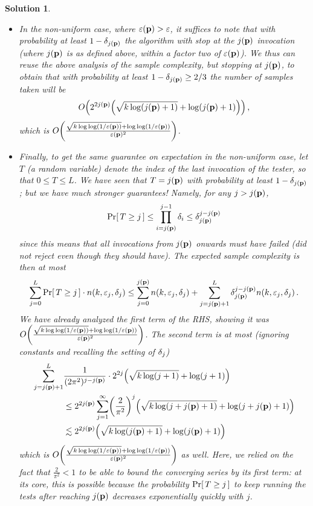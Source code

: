 \documentclass[biber,plain]{nowfnt} %
\newtheorem{solution}{Solution}[chapter]
\begin{document}
\begin{solution}
\begin{itemize}
\[
	\bigO{\frac{\sqrt{\ab\log\log(1/\dst)} + \log\log(1/\dst)}{\dst^2}}
\]
as claimed.
\item In the non-uniform case, where $\varepsilon(\mathbf{p}) > \varepsilon$, it suffices to note that with probability at least $1-\delta_{j(\mathbf{p})}$ the algorithm with stop at the $j(\mathbf{p})$ invocation (where $j(\mathbf{p})$ is as defined above, within a factor two of $\varepsilon(\mathbf{p})$). We thus can reuse the above analysis of the sample complexity, but stopping at $j(\mathbf{p})$, to obtain that with probability at least $1-\delta_{j(\mathbf{p})} \geq 2/3$ the number of samples taken will be
\[
	\bigO{2^{2j(\p)}\Paren{\sqrt{\ab\log(j(\p)+1)} + \log(j(\p)+1)}}\,,
\]
which is $\bigO{\frac{\sqrt{\ab\log\log(1/\dst(\p))} + \log\log(1/\dst(\p))}{\dst(\p)^2}}$.
\item Finally, to get the same guarantee \emph{on expectation} in the non-uniform case, let $T$ (a random variable) denote the index of the last invocation of the tester, so that $0\leq T \leq L$. We have seen that $T=j(\mathbf{p})$ with probability at least $1-\delta_{j(\mathbf{p})}$; but we have much stronger guarantees! Namely, for any $j > j(\mathbf{p})$,
\[
	\probaOf{T \geq j} \leq \prod_{i=j(\p)}^{j-1}\errprob_{i} \leq \errprob_{j(\p)}^{j-j(\p)}
\]
since this means that all invocations from $j(\mathbf{p})$ onwards must have failed (\ie did not reject even though they should have). The expected sample complexity is then at most
\[
	\sum_{j=0}^L \probaOf{T \geq j}\cdot  \ns(\ab,\dst_j, \errprob_j)
	\leq \sum_{j=0}^{j(\p)} \ns(\ab,\dst_j, \errprob_j)
	+ \sum_{j=j(\p)+1}^L \errprob_{j(\p)}^{j-j(\p)} \ns(\ab,\dst_j, \errprob_j)\,.
\]
We have already analyzed the first term of the RHS, showing it was $\bigO{\frac{\sqrt{\ab\log\log(1/\dst(\p))} + \log\log(1/\dst(\p))}{\dst(\p)^2}}$. The second term is at most (ignoring constants and recalling the setting of $\delta_j$)
\begin{align*}
	\sum_{j=j(\p)+1}^L &\frac{1}{(2\pi^2)^{j-j(\p)}} \cdot 2^{2j}\Paren{\sqrt{\ab\log(j+1)} + \log(j+1)} \\
	&\leq 2^{2j(\p)}\sum_{j=1}^\infty \Paren{\frac{2}{\pi^2}}^{j}\Paren{\sqrt{\ab\log(j+j(\p)+1)} + \log(j+j(\p)+1)} \\
	&\lesssim 2^{2j(\p)}\Paren{\sqrt{\ab\log(j(\p)+1)} + \log(j(\p)+1)}
\end{align*}
which is $\bigO{\frac{\sqrt{\ab\log\log(1/\dst(\p))} + \log\log(1/\dst(\p))}{\dst(\p)^2}}$ as well. Here, we relied on the fact that $\frac{2}{\pi^2} < 1$ to be able to bound the converging series by its first term: at its core, this is possible because the probability $\probaOf{T \geq j}$ to keep running the tests after reaching $j(\mathbf{p})$ decreases exponentially quickly with $j$.
\end{itemize}
\end{solution}
\end{document}
